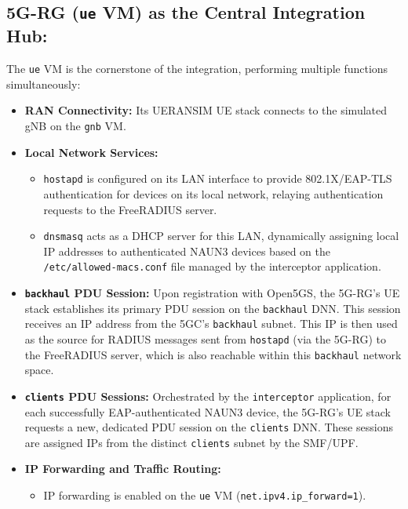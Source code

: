 \subsection{\acs{5G-RG} (\texttt{ue} \acs{VM}) as the Central Integration Hub:}

The \texttt{ue} \ac{VM} is the cornerstone of the integration, performing multiple functions simultaneously:

\begin{itemize}
    \item \textbf{\ac{RAN} Connectivity:} Its UERANSIM \ac{UE} stack connects to the simulated \ac{gNB} on the \texttt{gnb} VM.

    \item{
        \textbf{Local Network Services:}
        \begin{itemize}
            \item \texttt{hostapd} is configured on its \ac{LAN} interface to provide 802.1X/\ac{EAP-TLS} authentication for devices on its local network, relaying authentication requests to the FreeRADIUS server.

            \item \texttt{dnsmasq} acts as a \ac{DHCP} server for this \ac{LAN}, dynamically assigning local \ac{IP} addresses to authenticated \ac{NAUN3} devices based on the \texttt{/etc/allowed-macs.conf} file managed by the interceptor application.
        \end{itemize}
    }

    \item \textbf{\texttt{backhaul} \ac{PDU} Session:} Upon registration with Open5GS, the \ac{5G-RG}'s \ac{UE} stack establishes its primary \ac{PDU} session on the \texttt{backhaul} \ac{DNN}. This session receives an \ac{IP} address from the \ac{5GC}'s \texttt{backhaul} subnet. This \ac{IP} is then used as the source for \ac{RADIUS} messages sent from \texttt{hostapd} (via the \ac{5G-RG}) to the FreeRADIUS server, which is also reachable within this \texttt{backhaul} network space.

    \item \textbf{\texttt{clients} \ac{PDU} Sessions:} Orchestrated by the \texttt{interceptor} application, for each successfully \ac{EAP}-authenticated \ac{NAUN3} device, the \ac{5G-RG}'s \ac{UE} stack requests a new, dedicated \ac{PDU} session on the \texttt{clients} \ac{DNN}. These sessions are assigned \acp{IP} from the distinct \texttt{clients} subnet by the \ac{SMF}/\ac{UPF}.

    \item{
        \textbf{\ac{IP} Forwarding and Traffic Routing:}
        \begin{itemize}
            \item \ac{IP} forwarding is enabled on the \texttt{ue} \ac{VM} (\texttt{net.ipv4.ip\_forward=1}).


\end{itemize}}
\end{itemize}
